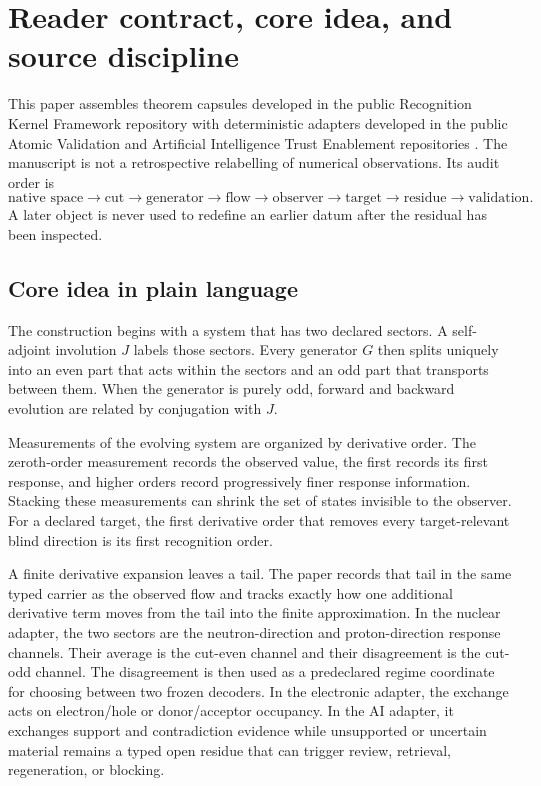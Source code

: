 \section{Reader contract, core idea, and source discipline}

This paper assembles theorem capsules developed in the public Recognition Kernel Framework repository with deterministic adapters developed in the public Atomic Validation and Artificial Intelligence Trust Enablement repositories \cite{rkfRelease,atomicRelease,aiTrustRelease}. The manuscript is not a retrospective relabelling of numerical observations. Its audit order is
\[
\text{native space}\to\text{cut}\to\text{generator}\to\text{flow}\to
\text{observer}\to\text{target}\to\text{residue}\to\text{validation}.
\]
A later object is never used to redefine an earlier datum after the residual has been inspected.

\subsection{Core idea in plain language}

The construction begins with a system that has two declared sectors. A self-adjoint involution $J$ labels those sectors. Every generator $G$ then splits uniquely into an even part that acts within the sectors and an odd part that transports between them. When the generator is purely odd, forward and backward evolution are related by conjugation with $J$.

Measurements of the evolving system are organized by derivative order. The zeroth-order measurement records the observed value, the first records its first response, and higher orders record progressively finer response information. Stacking these measurements can shrink the set of states invisible to the observer. For a declared target, the first derivative order that removes every target-relevant blind direction is its first recognition order.

A finite derivative expansion leaves a tail. The paper records that tail in the same typed carrier as the observed flow and tracks exactly how one additional derivative term moves from the tail into the finite approximation. In the nuclear adapter, the two sectors are the neutron-direction and proton-direction response channels. Their average is the cut-even channel and their disagreement is the cut-odd channel. The disagreement is then used as a predeclared regime coordinate for choosing between two frozen decoders. In the electronic adapter, the exchange acts on electron/hole or donor/acceptor occupancy. In the AI adapter, it exchanges support and contradiction evidence while unsupported or uncertain material remains a typed open residue that can trigger review, retrieval, regeneration, or blocking.

